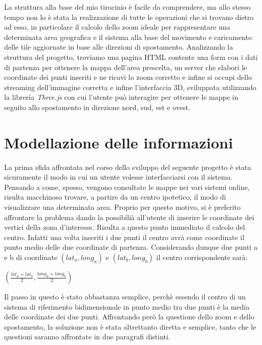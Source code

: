 La struttura alla base del mio tirocinio è facile da comprendere, ma allo stesso tempo non lo è stata la realizzazione di tutte le operazioni che si trovano dietro ad esso, in particolare il calcolo dello zoom ideale per rappresentare una determinata area geografica e il sistema alla base del movimento e caricamento delle tile aggiornate in base alle direzioni di spostamento. Analizzando la struttura del progetto, troviamo una pagina HTML contente una form con i dati di partenza per ottenere la mappa dell'area prescelta, un server che elabori le coordinate dei punti inseriti e ne ricavi lo zoom corretto e infine si occupi dello streaming dell'immagine corretta e infine l'interfaccia 3D, sviluppata utilizzando la libreria \textit{Three.js} con cui l'utente può interagire per ottenere le mappe in seguito allo spostamento in direzione nord, sud, est e ovest.

\section{Modellazione delle informazioni}
La prima sfida affrontata nel corso dello sviluppo del seguente progetto è stata sicuramente il modo in cui un utente volesse interfacciarsi con il sistema. Pensando a come, spesso, vengono consultate le mappe nei vari sistemi online, risulta macchinoso trovare, a partire da un centro ipotetico, il modo di visualizzare una determinata area. Proprio per questo motivo, si è preferito affrontare la problema dando la possibilià all'utente di inserire le coordinate dei vertici della zona d'interesse. Risulta a questo punto immediato il calcolo del centro. Infatti una volta inseriti i due punti il centro avrà come coordinate il punto medio delle due coordinate di partenza. Considerando dunque due punti a e b di coordinate $(lat_{a}, long_{a})$ e $(lat_{b}, long_{b})$ il centro corrispondente sarà:
\begin{center}

	\LARGE$(\frac{lat_{a}+lat_{b}}{2} , \frac{long_{a}+long_{b}}{2})$\par

\end{center}
Il passo in questo è stato abbastanza semplice, perchè essendo il centro di un sistema di riferimento bidimensionale in punto medio tra due punti è la media delle coordinate dei due punti. Affrontando però la questione dello zoom e dello spostamento, la soluzione non è stata altrettanto diretta e semplice, tanto che le questioni saranno affrontate in due paragrafi distinti.

